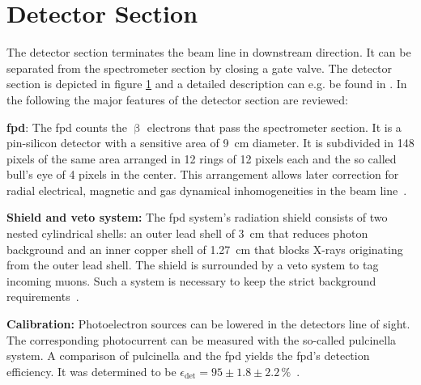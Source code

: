 \section{Detector Section}
\label{sec:katrinExpSetupDetector}
\begin{figure}[t]
 \label{fig:katrinExpSetupDetector}
\end{figure}

The detector section terminates the beam line in downstream direction. It can be separated from the spectrometer section by closing a gate valve. The detector section is depicted in figure \ref{fig:katrinExpSetupDetector} and a detailed description can e.g. be found in \cite{Amsbaugh2015}. In the following the major features of the detector section are reviewed:

{\par \textbf{\Gls{fpd}}: The \gls{fpd} counts the $\upbeta$ electrons that pass the spectrometer section. It is a pin-silicon detector with a sensitive area of \SI{9}{cm} diameter. It is subdivided in 148 pixels of the same area arranged in 12 rings of 12 pixels each and the so called bull's eye of 4 pixels in the center. This arrangement allows later correction for radial electrical, magnetic and gas dynamical inhomogeneities in the beam line~\cite{Amsbaugh2015}.}

{\par \textbf{Shield and veto system:} The \gls{fpd} system's radiation shield consists of two nested cylindrical shells: an outer lead shell of \SI{3}{cm} that reduces photon background and an inner copper shell of \SI{1.27}{cm} that blocks X-rays originating from the outer lead shell. The shield is surrounded by a veto system to tag incoming muons. Such a system is necessary to keep the strict background requirements~\cite{Amsbaugh2015}.}

{\par \textbf{Calibration:} Photoelectron sources can be lowered in the detectors line of sight. The corresponding photocurrent can be measured with the so-called \gls{pulcinella} system. A comparison of \gls{pulcinella} and the \gls{fpd} yields the \gls{fpd}'s detection efficiency. It was determined to be $\epsilon_\mathrm{det}=95\pm1.8\pm2.2\,\text{\%}$~\cite{Amsbaugh2015}.}

